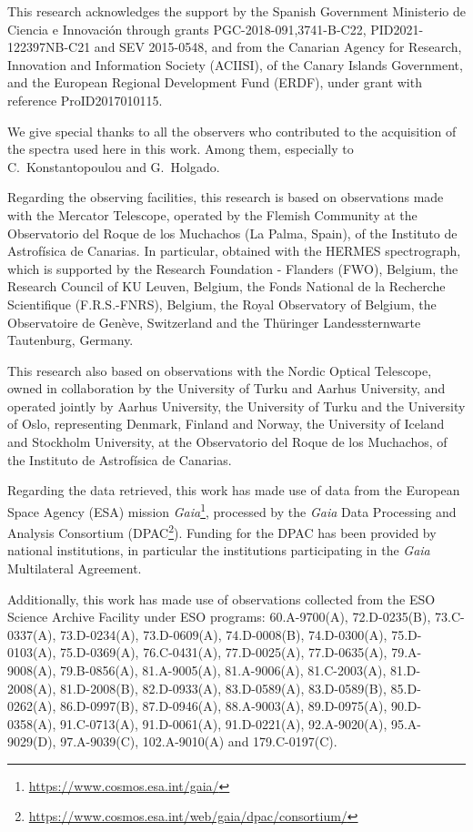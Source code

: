 \documentclass{aa}
\begin{document}
\begin{acknowledgements}

This research acknowledges the support by the Spanish Government Ministerio de Ciencia e Innovaci\'on through grants PGC-2018-091,3741-B-C22, PID2021-122397NB-C21 and SEV 2015-0548, and from the Canarian Agency for Research, Innovation and Information Society (ACIISI), of the Canary Islands Government, and the European Regional Development Fund (ERDF), under grant with reference ProID2017010115.

We give special thanks to all the observers who contributed to the acquisition of the spectra used here in this work. Among them, especially to C.~Konstantopoulou and G.~Holgado.  

Regarding the observing facilities, this research is based on observations made with the Mercator Telescope, operated by the Flemish Community at the Observatorio del Roque de los Muchachos (La Palma, Spain), of the Instituto de Astrof\'isica de Canarias. In particular, obtained with the HERMES spectrograph, which is supported by the Research Foundation - Flanders (FWO), Belgium, the Research Council of KU Leuven, Belgium, the Fonds National de la Recherche Scientifique (F.R.S.-FNRS), Belgium, the Royal Observatory of Belgium, the Observatoire de Genève, Switzerland and the Thüringer Landessternwarte Tautenburg, Germany.

This research also based on observations with the Nordic Optical Telescope, owned in collaboration by the University of Turku and Aarhus University, and operated jointly by Aarhus University, the University of Turku and the University of Oslo, representing Denmark, Finland and Norway, the University of Iceland and Stockholm University, at the Observatorio del Roque de los Muchachos, of the Instituto de Astrof\'isica de Canarias.

Regarding the data retrieved, this work has made use of data from the European Space Agency (ESA) mission {\it Gaia}\footnote{\url{https://www.cosmos.esa.int/gaia/}}, processed by the {\it Gaia} Data Processing and Analysis Consortium (DPAC\footnote{\url{https://www.cosmos.esa.int/web/gaia/dpac/consortium/}}). Funding for the DPAC has been provided by national institutions, in particular the institutions participating in the {\it Gaia} Multilateral Agreement.

Additionally, this work has made use of observations collected from the ESO Science Archive Facility under ESO programs: 60.A-9700(A), 72.D-0235(B), 73.C-0337(A), 73.D-0234(A), 73.D-0609(A), 74.D-0008(B), 74.D-0300(A), 75.D-0103(A), 75.D-0369(A), 76.C-0431(A), 77.D-0025(A), 77.D-0635(A), 79.A-9008(A), 79.B-0856(A), 81.A-9005(A), 81.A-9006(A), 81.C-2003(A), 81.D-2008(A), 81.D-2008(B), 82.D-0933(A), 83.D-0589(A), 83.D-0589(B), 85.D-0262(A), 86.D-0997(B), 87.D-0946(A), 88.A-9003(A), 89.D-0975(A), 90.D-0358(A), 91.C-0713(A), 91.D-0061(A), 91.D-0221(A), 92.A-9020(A), 95.A-9029(D), 97.A-9039(C), 102.A-9010(A) and 179.C-0197(C).

\end{acknowledgements}
\end{document}
